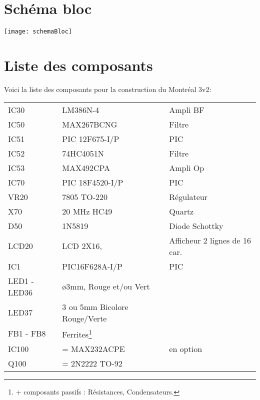\section{Schéma bloc}

\texttt{[image: schemaBloc]}

\section{Liste des composants}
Voici la liste des composants pour la construction du Montréal 3v2:

\begin{tabular}{ l l l}

IC30&          LM386N-4&                  Ampli BF\\
IC50&          MAX267BCNG&          Filtre\\
IC51& PIC  12F675-I/P& PIC \\
IC52&          74HC4051N&               Filtre\\
IC53&          MAX492CPA &            Ampli Op\\
IC70& PIC  18F4520-I/P& PIC\\
VR20 &       7805 TO-220  &            Régulateur\\
X70&           20 MHz  HC49&           Quartz\\
D50&           1N5819       &                Diode Schottky\\
LCD20&      LCD 2X16,&                 Afficheur 2 lignes de 16 car.\\
IC1& PIC16F628A-I/P& PIC\\
LED1 - LED36& ø3mm, Rouge et/ou Vert&\\
LED37&                        3 ou 5mm Bicolore Rouge/Verte &\\
FB1 - FB8&                   Ferrites\footnote{+ composants passifs : Résistances, Condensateurs.}&\\
IC100&        = MAX232ACPE&        en option\\
Q100 &        = 2N2222 TO-92&\\
\end{tabular}



